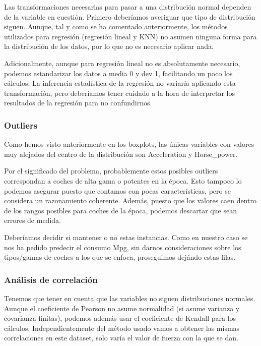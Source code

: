 Las transformaciones necesarias para pasar a una distribución normal dependen de la variable en cuestión. Primero deberíamos averiguar que tipo de distribución siguen.
Aunque, tal y como se ha comentado anteriormente, los métodos utilizados para regresión (regresión lineal y KNN) no asumen ninguna forma para la distribución de los datos, por lo que no es necesario aplicar nada.

Adicionalmente, aunque para regresión lineal no es absolutamente necesario, podemos estandarizar los datos a media 0 y dev 1, facilitando un poco los cálculos. La inferencia estadística de la regresión no variaría aplicando esta transformación, pero deberíamos tener cuidado a la hora de interpretar los resultados de la regresión para no confundirnos.

\subsubsection{Outliers}

Como hemos visto anteriormente en los boxplots, las únicas variables con valores muy alejados del centro de la distribución son Acceleration y Horse\_power.

Por el significado del problema, probablemente estos posibles outliers correspondan a coches de alta gama o potentes en la época. Esto tampoco lo podemos asegurar puesto que contamos con pocas características, pero se considera un razonamiento coherente. Además, puesto que los valores caen dentro de los rangos posibles para coches de la época, podemos descartar que sean errores de medida.

Deberíamos decidir si mantener o no estas instancias. Como en nuestro caso se nos ha pedido predecir el consumo Mpg, sin darnos consideraciones sobre los tipos/gamas de coches a los que se enfoca, proseguimos dejándo estas filas.

\subsubsection{Análisis de correlación}

Tenemos que tener en cuenta que las variables no siguen distribuciones normales. Aunque el coeficiente de Pearson no asume normalidad (si asume varianza y covarianza finitas), podemos además usar el coeficiente de Kendall para los cálculos. Independientemente del método usado vamos a obtener las mismas correlaciones en este dataset, solo varía el valor de fuerza con la que se dan.

